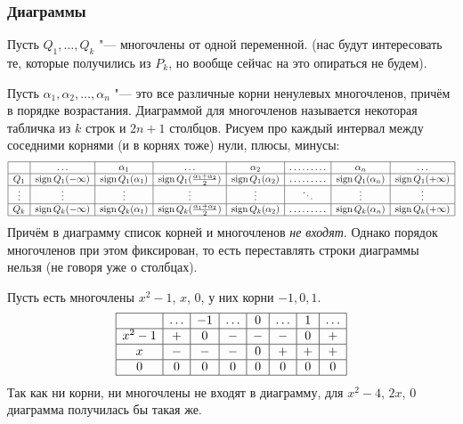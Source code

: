 \subsubsection{Диаграммы}
	Пусть $Q_1, \dots, Q_k$ "--- многочлены от одной переменной.
	(нас будут интересовать те, которые получились из $P_k$, но вообще сейчас на это опираться не будем).
	\begin{Def}
		Пусть $\alpha_1, \alpha_2, \dots, \alpha_n$ "--- это все различные корни ненулевых многочленов, причём в порядке возрастания.
		Диаграммой для многочленов называется некоторая табличка из $k$ строк и $2n+1$ столбцов.
		Рисуем про каждый интервал между соседними корнями (и в корнях тоже) нули, плюсы, минусы:
		\[
		\begin{array}{|c|c|c|c|c|c|c|c|}
		\hline
		& \dots & \alpha_1 & \dots & \alpha_2 & \dots\dots\dots & \alpha_n & \dots \\\hline
		Q_1 & \operatorname{sign} Q_1(-\infty) & \operatorname{sign} Q_1(\alpha_1) & \operatorname{sign} Q_1(\frac{\alpha_1+\alpha_2}{2}) & \operatorname{sign} Q_1(\alpha_2) & \dots\dots\dots & \operatorname{sign} Q_1(\alpha_n) & \operatorname{sign} Q_1(+\infty) \\\hline
		\vdots & \vdots & \vdots & \vdots & \vdots & \ddots & \vdots & \vdots \\\hline
		Q_k & \operatorname{sign} Q_k(-\infty) & \operatorname{sign} Q_k(\alpha_1) & \operatorname{sign} Q_k(\frac{\alpha_1+\alpha_2}{2}) & \operatorname{sign} Q_k(\alpha_2) & \dots\dots\dots & \operatorname{sign} Q_k(\alpha_n) & \operatorname{sign} Q_k(+\infty) \\\hline
		\end{array}
		\]
		Причём в диаграмму список корней и многочленов \textit{не входят}.
		Однако порядок многочленов при этом фиксирован, то есть переставлять строки диаграммы нельзя (не говоря уже о столбцах).
	\end{Def}
	\begin{exmp}
		Пусть есть многочлены $x^2-1$, $x$, $0$, у них корни $-1, 0, 1$.
		\[
		\begin{array}{|c|c|c|c|c|c|c|c|}
		\hline
		      & \dots & -1 & \dots & 0 & \dots & 1 & \dots \\\hline
		x^2-1 & +     & 0  & -     & - & -     & 0 & +     \\\hline
		x     & -     & -  & -     & 0 & +     & + & +     \\\hline
		0     & 0     & 0  & 0     & 0 & 0     & 0 & 0     \\\hline
		\end{array}
		\]
		Так как ни корни, ни многочлены не входят в диаграмму, для $x^2-4$, $2x$, $0$ диаграмма получилась бы такая же.
	\end{exmp}

